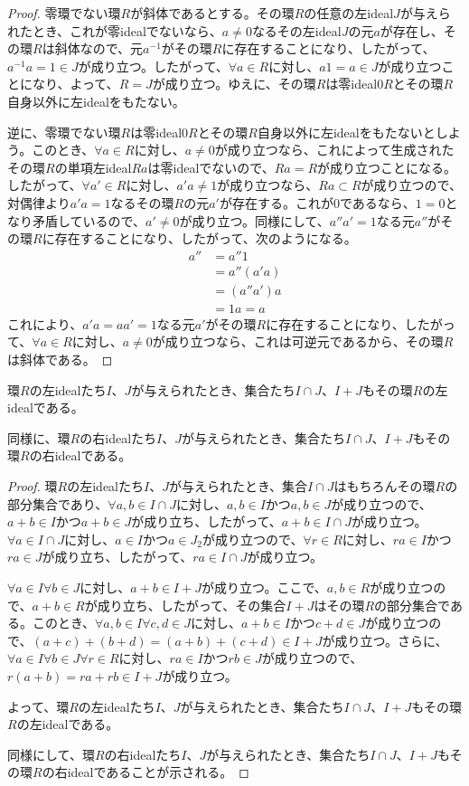 \documentclass[dvipdfmx]{jsarticle}
\begin{document}
\begin{proof}
零環でない環$R$が斜体であるとする。その環$R$の任意の左ideal$J$が与えられたとき、これが零idealでないなら、$a \neq 0$なるその左ideal$J$の元$a$が存在し、その環$R$は斜体なので、元$a^{-1}$がその環$R$に存在することになり、したがって、$a^{-1}a = 1 \in J$が成り立つ。したがって、$\forall a \in R$に対し、$a1 = a \in J$が成り立つことになり、よって、$R = J$が成り立つ。ゆえに、その環$R$は零ideal$0R$とその環$R$自身以外に左idealをもたない。\par
逆に、零環でない環$R$は零ideal$0R$とその環$R$自身以外に左idealをもたないとしよう。このとき、$\forall a \in R$に対し、$a \neq 0$が成り立つなら、これによって生成されたその環$R$の単項左ideal$Ra$は零idealでないので、$Ra = R$が成り立つことになる。したがって、$\forall a' \in R$に対し、$a'a \neq 1$が成り立つなら、$Ra \subset R$が成り立つので、対偶律より$a'a = 1$なるその環$R$の元$a'$が存在する。これが$0$であるなら、$1 = 0$となり矛盾しているので、$a' \neq 0$が成り立つ。同様にして、$a''a' = 1$なる元$a''$がその環$R$に存在することになり、したがって、次のようになる。
\begin{align*}
a'' &= a''1\\
&= a''\left( a'a \right)\\
&= \left( a''a' \right)a\\
&= 1a = a
\end{align*}
これにより、$a'a = aa' = 1$なる元$a'$がその環$R$に存在することになり、したがって、$\forall a \in R$に対し、$a \neq 0$が成り立つなら、これは可逆元であるから、その環$R$は斜体である。
\end{proof}
\begin{thm}\label{3.3.2.5}
環$R$の左idealたち$I$、$J$が与えられたとき、集合たち$I \cap J$、$I + J$もその環$R$の左idealである。\par
同様に、環$R$の右idealたち$I$、$J$が与えられたとき、集合たち$I \cap J$、$I + J$もその環$R$の右idealである。
\end{thm}
\begin{proof}
環$R$の左idealたち$I$、$J$が与えられたとき、集合$I \cap J$はもちろんその環$R$の部分集合であり、$\forall a,b \in I \cap J$に対し、$a,b \in I$かつ$a,b \in J$が成り立つので、$a + b \in I$かつ$a + b \in J$が成り立ち、したがって、$a + b \in I \cap J$が成り立つ。$\forall a \in I \cap J$に対し、$a \in I$かつ$a \in J_{2}$が成り立つので、$\forall r \in R$に対し、$ra \in I$かつ$ra \in J$が成り立ち、したがって、$ra \in I \cap J$が成り立つ。\par
$\forall a \in I\forall b \in J$に対し、$a + b \in I + J$が成り立つ。ここで、$a,b \in R$が成り立つので、$a + b \in R$が成り立ち、したがって、その集合$I + J$はその環$R$の部分集合である。このとき、$\forall a,b \in I\forall c,d \in J$に対し、$a + b \in I$かつ$c + d \in J$が成り立つので、$(a + c) + (b + d) = (a + b) + (c + d) \in I + J$が成り立つ。さらに、$\forall a \in I\forall b \in J\forall r \in R$に対し、$ra \in I$かつ$rb \in J$が成り立つので、$r(a + b) = ra + rb \in I + J$が成り立つ。\par
よって、環$R$の左idealたち$I$、$J$が与えられたとき、集合たち$I \cap J$、$I + J$もその環$R$の左idealである。\par
同様にして、環$R$の右idealたち$I$、$J$が与えられたとき、集合たち$I \cap J$、$I + J$もその環$R$の右idealであることが示される。
\end{proof}
\end{document}
